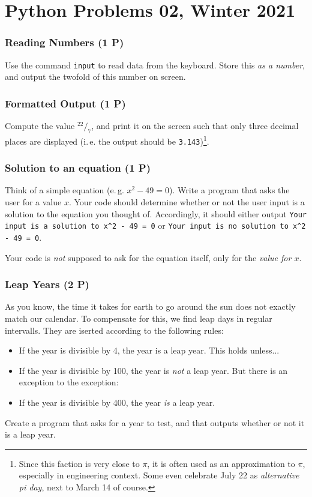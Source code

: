 \documentclass[
	english,
	fontsize=10pt,
	parskip=half,
	titlepage=true,
	DIV=12
]{scrartcl}
\newcommand*{\inPy}[1]{\texttt{#1}}
\newcommand*{\ie}{i.\,e. }
\newcommand*{\eg}{e.\,g. }
\begin{document}
\part*{Python Problems 02, Winter 2021}

\section{Reading Numbers (1 P)}
Use the command \inPy{input} to read data from the keyboard. Store this \emph{as a number}, and output the twofold of this number on screen.

\section{Formatted Output (1 P)}
Compute the value $^{22}/_{7}$, and print it on the screen such that only three decimal places are displayed (\ie the output should be \texttt{3.143})\footnote{Since this faction is very close to $\pi$, it is often used as an approximation to $\pi$, especially in engineering context. Some even celebrate July 22 as \emph{alternative pi day}, next to March 14 of course.}.

\section{Solution to an equation (1 P)}
Think of a simple equation (\eg $x^2 - 49 = 0$). 
Write a program that asks the user for a value $x$. Your code should determine whether or not the user input is a solution to the equation you thought of. Accordingly, it should either output \texttt{Your input is a solution to x\textasciicircum 2 - 49 = 0} or \texttt{Your input is no solution to x\textasciicircum 2 - 49 = 0}.

Your code is \emph{not} supposed to ask for the equation itself, only for the \emph{value for $x$}.

\section{Leap Years (2 P)}
As you know, the time it takes for earth to go around the sun does not exactly match our calendar. To compensate for this, we find leap days in regular intervalls. They are iserted according to the following rules:

\begin{itemize}
  \item If the year is divisible by 4, the year is a leap year. This holds unless...
  \item If the year is divisible by 100, the year is \emph{not} a leap year. But there is an exception to the exception:
  \item If the year is divisible by 400, the year \emph{is} a leap year.
\end{itemize}
Create a program that asks for a year to test, and that outputs whether or not it is a leap year.
\end{document}
